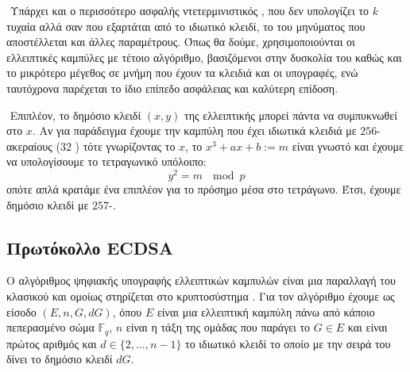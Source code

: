 \documentclass[oneside,a4paper]{article}
\begin{document}
$ $\newline
Υπάρχει και ο περισσότερο ασφαλής ντετερμινιστικός , που δεν υπολογίζει το $k$ τυχαία αλλά σαν  που εξαρτάται από το ιδιωτικό κλειδί, το  του μηνύματος που αποστέλλεται και άλλες παραμέτρους. Όπως θα δούμε, χρησιμοποιούνται οι ελλειπτικές καμπύλες με τέτοιο αλγόριθμο, βασιζόμενοι στην δυσκολία του  καθώς και το μικρότερο μέγεθος σε μνήμη που έχουν τα κλειδιά και οι υπογραφές, ενώ ταυτόχρονα παρέχεται το ίδιο επίπεδο ασφάλειας και καλύτερη επίδοση. 

$ $\newline
Επιπλέον, το δημόσιο κλειδί $(x,y)$ της ελλειπτικής μπορεί πάντα να συμπυκνωθεί στο $x$. Αν για παράδειγμα έχουμε την καμπύλη  που έχει ιδιωτικά κλειδιά με $256$- ακεραίους (32 ) τότε γνωρίζοντας το $x$, το $x^3+ax+b := m$ είναι γνωστό και έχουμε να υπολογίσουμε το τετραγωνικό υπόλοιπο:
$$y^2 = m \ \mod p$$ οπότε απλά κρατάμε ένα επιπλέον  για το πρόσημο μέσα στο τετράγωνο. Έτσι, έχουμε δημόσιο κλειδί με $257$-. 

\subsection{Πρωτόκολλο ECDSA}

\vspace*{0.3cm}
\noindent Ο αλγόριθμος ψηφιακής υπογραφής ελλειπτικών καμπυλών  είναι μια παραλλαγή του κλασικού  και ομοίως στηρίζεται στο κρυπτοσύστημα . Για τον αλγόριθμο έχουμε ως είσοδο $(E,n,G,dG)$, όπου $E$ είναι μια ελλειπτική καμπύλη πάνω από κάποιο πεπερασμένο σώμα $\mathbb{F}_q$, $n$ είναι η τάξη της ομάδας που παράγει το $G\in E$ και είναι πρώτος αριθμός και $d \in \{2,\ldots, n-1\}$ το ιδιωτικό κλειδί το οποίο με την σειρά του δίνει το δημόσιο κλειδί $d G$.
\end{document}
